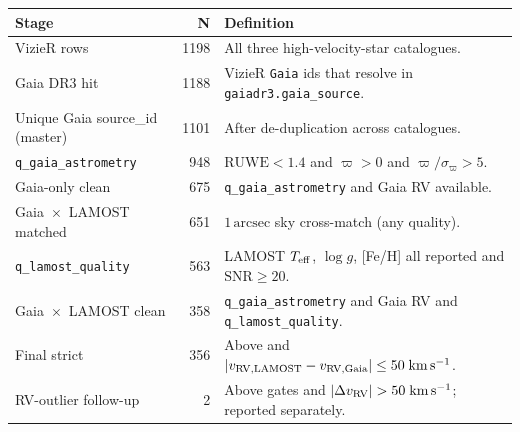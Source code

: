 \begin{tabular}{lrl}
\toprule
Stage & N & Definition \\
\midrule
VizieR rows & 1198 & All three high-velocity-star catalogues. \\
Gaia DR3 hit & 1188 & VizieR \texttt{Gaia} ids that resolve in \texttt{gaiadr3.gaia\_source}. \\
Unique Gaia source\_id (master) & 1101 & After de-duplication across catalogues. \\
\texttt{q\_gaia\_astrometry} & 948 & $\mathrm{RUWE}<1.4$ and $\varpi>0$ and $\varpi/\sigma_{\varpi}>5$. \\
Gaia-only clean & 675 & \texttt{q\_gaia\_astrometry} and Gaia RV available. \\
Gaia~$\times$~LAMOST matched & 651 & $1\,\mathrm{arcsec}$ sky cross-match (any quality). \\
\texttt{q\_lamost\_quality} & 563 & LAMOST $T_{\rm eff}$, $\log g$, [Fe/H] all reported and $\mathrm{SNR}\geq 20$. \\
Gaia~$\times$~LAMOST clean & 358 & \texttt{q\_gaia\_astrometry} and Gaia RV and \texttt{q\_lamost\_quality}. \\
Final strict & 356 & Above and $|v_{\rm RV,LAMOST}-v_{\rm RV,Gaia}|\leq 50\;\mathrm{km\,s^{-1}}$. \\
RV-outlier follow-up & 2 & Above gates and $|\Delta v_{\rm RV}|>50\;\mathrm{km\,s^{-1}}$; reported separately. \\
\bottomrule
\end{tabular}
